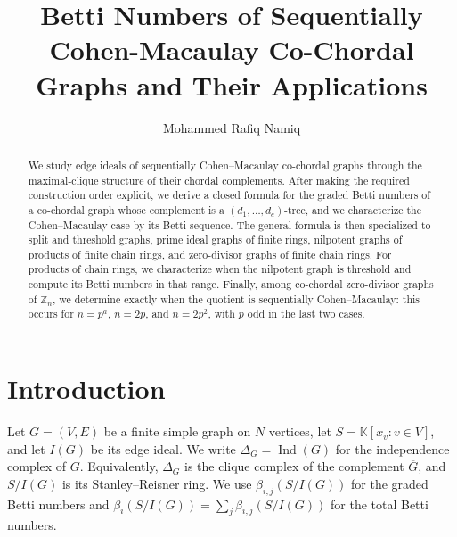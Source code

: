 \documentclass[12pt, reqno]{amsart}
\theoremstyle{definition}
\numberwithin{equation}{section}
\begin{document}
	
	\title[Betti Numbers of SCM Co-Chordal Graphs]{Betti Numbers of Sequentially Cohen-Macaulay Co-Chordal Graphs and Their Applications}
	
	\author{Mohammed Rafiq Namiq}
	\address{Department of Mathematics, College of Science, University of Sulaimani, Kurdistan Region, Iraq}
	
	
	\begin{abstract}
We study edge ideals of sequentially Cohen--Macaulay co-chordal graphs through the maximal-clique structure of their chordal complements.  After making the required construction order explicit, we derive a closed formula for the graded Betti numbers of a co-chordal graph whose complement is a $(d_1,\ldots,d_e)$-tree, and we characterize the Cohen--Macaulay case by its Betti sequence.  The general formula is then specialized to split and threshold graphs, prime ideal graphs of finite rings, nilpotent graphs of products of finite chain rings, and zero-divisor graphs of finite chain rings.  For products of chain rings, we characterize when the nilpotent graph is threshold and compute its Betti numbers in that range.  Finally, among co-chordal zero-divisor graphs of $\mathbb Z_n$, we determine exactly when the quotient is sequentially Cohen--Macaulay: this occurs for $n=p^a$, $n=2p$, and $n=2p^2$, with $p$ odd in the last two cases.
\end{abstract}
	
	\maketitle
	
	\section{Introduction}

Let $G=(V,E)$ be a finite simple graph on $N$ vertices, let $S=\mathbb K[x_v:v\in V]$, and let $I(G)$ be its edge ideal.  We write $\Delta_G=\operatorname{Ind}(G)$ for the independence complex of $G$.  Equivalently, $\Delta_G$ is the clique complex of the complement $\overline G$, and $S/I(G)$ is its Stanley--Reisner ring.  We use $\beta_{i,j}(S/I(G))$ for the graded Betti numbers and $\beta_i(S/I(G))=\sum_j\beta_{i,j}(S/I(G))$ for the total Betti numbers.
\end{document}
